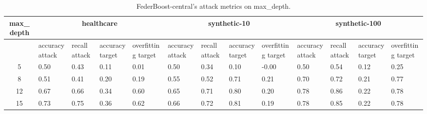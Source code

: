 \begin{table*}[]\centering
\begin{tabular}{|c| *{12}{m{1.0cm}|}}
\hline\rowcolor{gray!50}
\cellcolor{gray!80} max_depth & \multicolumn{4}{c|}{healthcare} & \multicolumn{4}{c|}{synthetic-10} & \multicolumn{4}{c|}{synthetic-100}\\\hline 
& accuracy attack & recall attack & accuracy target & overfitting target & accuracy attack & recall attack & accuracy target & overfitting target & accuracy attack & recall attack & accuracy target & overfitting target\\\hline
5 & 0.50 & 0.43 & 0.11 & 0.01 & 0.50 & 0.34 & 0.10 & -0.00 & 0.50 & 0.54 & 0.12 & 0.25\\ \hline
8 & 0.51 & 0.41 & 0.20 & 0.19 & 0.55 & 0.52 & 0.71 & 0.21 & 0.70 & 0.72 & 0.21 & 0.77\\ \hline
12 & 0.67 & 0.66 & 0.34 & 0.60 & 0.65 & 0.71 & 0.80 & 0.20 & 0.78 & 0.86 & 0.22 & 0.78\\ \hline
15 & 0.73 & 0.75 & 0.36 & 0.62 & 0.66 & 0.72 & 0.81 & 0.19 & 0.78 & 0.85 & 0.22 & 0.78\\ \hline
\end{tabular} 
\caption{FederBoost-central's attack metrics on max_depth.}
\label{tab:experiment1_max_depth}
\end{table*}
